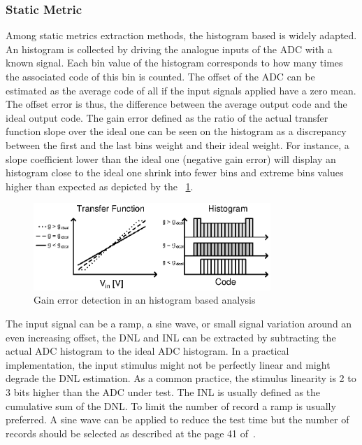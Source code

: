     \subsubsection{Static Metric}
Among static metrics extraction methods, the histogram based is widely adapted. An histogram is collected by driving the analogue inputs of the ADC with a known signal. Each bin value of the histogram corresponds to how many times the associated code of this bin is counted. The offset of the ADC can be estimated as the average code of all if the input signals applied have a zero mean. The offset error is thus, the difference between the average output code and the ideal output code. The gain error defined as the ratio of the actual transfer function slope over the ideal one can be seen on the histogram as a discrepancy between the first and the last bins weight and their ideal weight. For instance, a slope coefficient lower than the ideal one (negative gain error) will display an histogram close to the ideal one shrink into fewer bins and extreme bins values higher than expected as depicted by the \figurename~\ref{fig:gain-error-hist}.

\begin{figure}[htp]
    \centering
    \includegraphics[width=0.8\textwidth]{Chapter5/Figs/sar_test/histogram_gain_error.ps}
    \caption{Gain error detection in an histogram based analysis}
    \label{fig:gain-error-hist}
\end{figure}

The input signal can be a ramp, a sine wave, or small signal variation around an even increasing offset, the DNL and INL can be extracted by subtracting the actual ADC histogram to the ideal ADC histogram. In a practical implementation, the input stimulus might not be perfectly linear and might degrade the DNL estimation. As a common practice, the stimulus linearity is 2 to 3 bits higher than the ADC under test. The INL is usually defined as the cumulative sum of the DNL\@. To limit the number of record a ramp is usually preferred. A sine wave can be applied to reduce the test time but the number of records should be selected as described at the page 41 of~\cite{IEEESTD1241-2010}.

